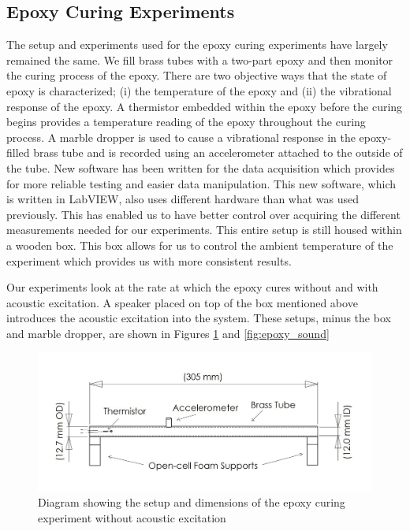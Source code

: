 \documentclass[]{aiaa-tc}%
\begin{document}
\subsection{Epoxy Curing Experiments}
The setup and experiments used for the epoxy curing experiments have largely remained the same. We fill brass tubes with a two-part epoxy and then monitor the curing process of the epoxy. There are two objective ways that the state of epoxy is characterized; (i) the temperature of the epoxy and (ii) the vibrational response of the epoxy. A thermistor embedded within the epoxy before the curing begins provides a temperature reading of the epoxy throughout the curing process. A marble dropper is used to cause a vibrational response in the epoxy-filled brass tube and is recorded using an accelerometer attached to the outside of the tube. New software has been written for the data acquisition which provides for more reliable testing and easier data manipulation. This new software, which is written in LabVIEW, also uses different hardware than what was used previously. This has enabled us to have better control over acquiring the different measurements needed for our experiments. This entire setup is still housed within a wooden box. This box allows for us to control the ambient temperature of the experiment which provides us with more consistent results. 

Our experiments look at the rate at which the epoxy cures without and with acoustic excitation. A speaker placed on top of the box mentioned above introduces the acoustic excitation into the system. These setups, minus the box and marble dropper, are shown in Figures \ref{fig:epoxy_no_sound} and \ref{fig:epoxy_sound}

\begin{figure}[H]%
\centering
 \includegraphics{epoxy_no_sound}
 \caption{Diagram showing the setup and dimensions of the epoxy curing experiment without acoustic excitation}
 \label{fig:epoxy_no_sound}
\end{figure}
\end{document}
